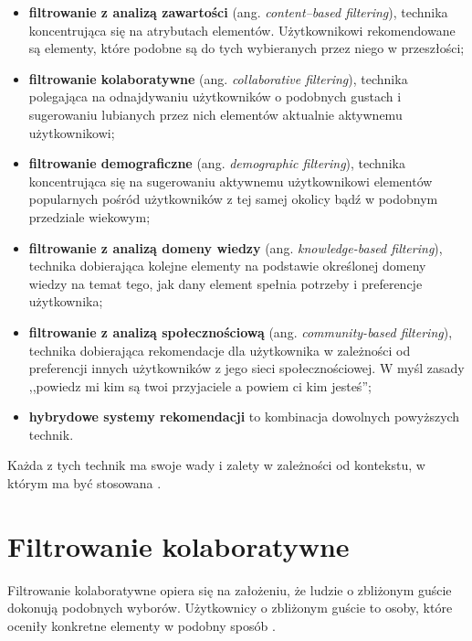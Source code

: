 \documentclass[twoside]{iisthesis}
\begin{document}
	 \begin{itemize}
	 	\item \textbf{filtrowanie z analizą zawartości} (ang. \textit{content--based filtering}), technika koncentrująca się na atrybutach elementów. Użytkownikowi rekomendowane są elementy, które podobne są do tych wybieranych przez niego w przeszłości;
	 	\item \textbf{filtrowanie kolaboratywne} (ang. \textit{collaborative filtering}), technika polegająca na odnajdywaniu użytkowników o podobnych gustach i sugerowaniu lubianych przez nich elementów aktualnie aktywnemu użytkownikowi;
	 	\item \textbf{filtrowanie demograficzne} (ang. \textit{demographic filtering}), technika koncentrująca się na sugerowaniu aktywnemu użytkownikowi elementów popularnych pośród użytkowników z tej samej okolicy bądź w podobnym przedziale wiekowym;
	 	\item \textbf{filtrowanie z analizą domeny wiedzy} (ang. \textit{knowledge-based filtering}), technika dobierająca kolejne elementy na podstawie określonej domeny wiedzy na temat tego, jak dany element spełnia potrzeby i preferencje użytkownika;	
	 	\item \textbf{filtrowanie z analizą społecznościową} (ang. \textit{community-based filtering}), technika dobierająca rekomendacje dla użytkownika w zależności od preferencji innych użytkowników z jego sieci społecznościowej. W myśl zasady ,,powiedz mi kim są twoi przyjaciele a powiem ci kim jesteś'';
	 	\item \textbf{hybrydowe systemy rekomendacji} to kombinacja dowolnych powyższych technik.
	 \end{itemize}
	 
	 Każda z tych technik ma swoje wady i zalety w zależności od kontekstu, w którym ma być stosowana \cite{id:IntroductionToRecommenderSystemsHandbook}. 
	 
	 
	  \section{Filtrowanie kolaboratywne}
	  
	  Filtrowanie kolaboratywne opiera się na założeniu, że ludzie o zbliżonym guście dokonują podobnych wyborów. Użytkownicy o zbliżonym guście to osoby, które oceniły konkretne elementy w podobny sposób \cite{id:IntroductionToRecommenderSystemsHandbook, id:CollaborativeFilteringRecommenderSystems, id:huynh2012modeling}. 
	  
\end{document}
